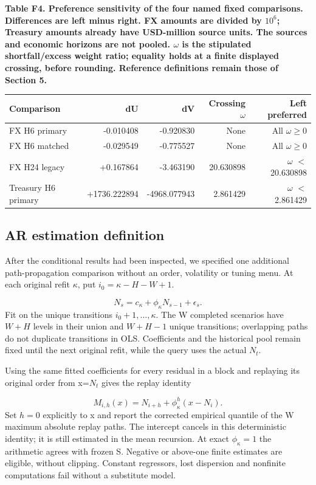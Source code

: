 \documentclass[10pt,a4paper]{article}
\begin{document}
\begin{center}
\begin{minipage}{\linewidth}
\small\textbf{Table F4. Preference sensitivity of the four named fixed comparisons. Differences are left minus right. FX amounts are divided by \(10^6\); Treasury amounts already have USD-million source units. The sources and economic horizons are not pooled. \(\omega\) is the stipulated shortfall/excess weight ratio; equality holds at a finite displayed crossing, before rounding. Reference definitions remain those of Section 5.}\par\medskip
\centering\fontsize{8}{10}\selectfont
\begin{tabular}{lrrrr}
\toprule
Comparison & dU & dV & Crossing \(\omega\) & Left preferred \\
\midrule
FX H6 primary & -0.010408 & -0.920830 & None & All \(\omega\ge0\) \\
FX H6 matched & -0.029549 & -0.775527 & None & All \(\omega\ge0\) \\
FX H24 legacy & +0.167864 & -3.463190 & 20.630898 & \(\omega\) \( < \) 20.630898 \\
Treasury H6 primary & +1736.222894 & -4968.077943 & 2.861429 & \(\omega\) \( < \) 2.861429 \\
\bottomrule
\end{tabular}
\end{minipage}
\end{center}
\subsection*{AR estimation definition}
After the conditional results had been inspected, we specified one additional path-propagation comparison without an order, volatility or tuning menu. At each original refit \(\kappa\), put \(i_0=\kappa-H-W+1\).

\[
N_s=c_\kappa+\phi_\kappa N_{s-1}+\epsilon_s.
\]
Fit on the unique transitions \(i_0+1,\ldots,\kappa\). The W completed scenarios have \(W+H\) levels in their union and \(W+H-1\) unique transitions; overlapping paths do not duplicate transitions in OLS. Coefficients and the historical pool remain fixed until the next original refit, while the query uses the actual \(N_t\).

Using the same fitted coefficients for every residual in a block and replaying its original order from x=\(N_t\) gives the replay identity

\[
M_{i,h}(x)=N_{i+h}+\phi_\kappa^h(x-N_i).
\]
Set \(h=0\) explicitly to x and report the corrected empirical quantile of the W maximum absolute replay paths. The intercept cancels in this deterministic identity; it is still estimated in the mean recursion. At exact \(\phi_\kappa=1\) the arithmetic agrees with frozen S. Negative or above-one finite estimates are eligible, without clipping. Constant regressors, lost dispersion and nonfinite computations fail without a substitute model.
\end{document}

